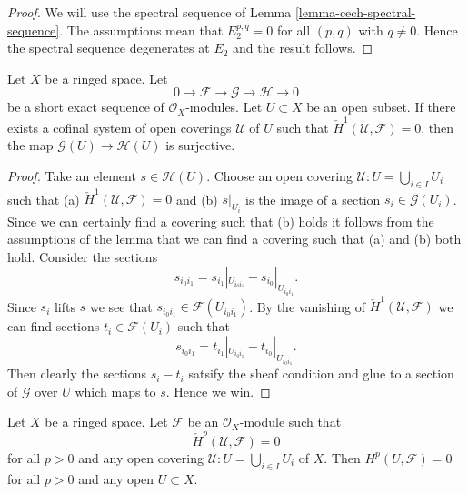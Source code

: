 \begin{proof}
We will use the spectral sequence of
Lemma \ref{lemma-cech-spectral-sequence}.
The assumptions mean that $E_2^{p, q} = 0$ for all $(p, q)$ with
$q \not = 0$. Hence the spectral sequence degenerates at $E_2$
and the result follows.
\end{proof}

\begin{lemma}
\label{lemma-ses-cech-h1}
Let $X$ be a ringed space.
Let
$$
0 \to \mathcal{F} \to \mathcal{G} \to \mathcal{H} \to 0
$$
be a short exact sequence of $\mathcal{O}_X$-modules.
Let $U \subset X$ be an open subset.
If there exists a cofinal system of open coverings $\mathcal{U}$
of $U$ such that $\check{H}^1(\mathcal{U}, \mathcal{F}) = 0$,
then the map $\mathcal{G}(U) \to \mathcal{H}(U)$ is
surjective.
\end{lemma}

\begin{proof}
Take an element $s \in \mathcal{H}(U)$. Choose an open covering
$\mathcal{U} : U = \bigcup_{i \in I} U_i$ such that
(a) $\check{H}^1(\mathcal{U}, \mathcal{F}) = 0$ and (b)
$s|_{U_i}$ is the image of a section $s_i \in \mathcal{G}(U_i)$.
Since we can certainly find a covering such that (b) holds
it follows from the assumptions of the lemma that we can find
a covering such that (a) and (b) both hold.
Consider the sections
$$
s_{i_0i_1} = s_{i_1}|_{U_{i_0i_1}} - s_{i_0}|_{U_{i_0i_1}}.
$$
Since $s_i$ lifts $s$ we see that $s_{i_0i_1} \in \mathcal{F}(U_{i_0i_1})$.
By the vanishing of $\check{H}^1(\mathcal{U}, \mathcal{F})$ we can
find sections $t_i \in \mathcal{F}(U_i)$ such that
$$
s_{i_0i_1} = t_{i_1}|_{U_{i_0i_1}} - t_{i_0}|_{U_{i_0i_1}}.
$$
Then clearly the sections $s_i - t_i$ satsify the sheaf condition
and glue to a section of $\mathcal{G}$ over $U$ which maps to $s$.
Hence we win.
\end{proof}

\begin{lemma}
\label{lemma-cech-vanish}
Let $X$ be a ringed space.
Let $\mathcal{F}$ be an $\mathcal{O}_X$-module such that
$$
\check{H}^p(\mathcal{U}, \mathcal{F}) = 0
$$
for all $p > 0$ and
any open covering $\mathcal{U} : U = \bigcup_{i \in I} U_i$ of $X$.
Then $H^p(U, \mathcal{F}) = 0$ for all $p > 0$
and any open $U \subset X$.
\end{lemma}

